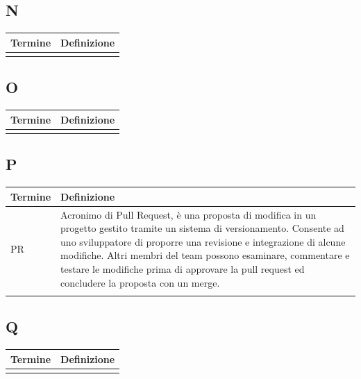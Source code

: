 \documentclass[10pt]{article}
\begin{document}
\subsection{N} %
\begin{tabularx}{\textwidth}{|>{\centering\arraybackslash}l|X|}
\hline
\rowcolor[gray]{0.8}
\textbf{Termine} & \textbf{Definizione}\\
\hline
 & \\
\hline
\end{tabularx}

\subsection{O} %
\begin{tabularx}{\textwidth}{|>{\centering\arraybackslash}l|X|}
\hline
\rowcolor[gray]{0.8}
\textbf{Termine} & \textbf{Definizione}\\
\hline
 & \\
\hline
\end{tabularx}

\subsection{P} %
\begin{tabularx}{\textwidth}{|>{\centering\arraybackslash}l|X|}
\hline
\rowcolor[gray]{0.8}
\textbf{Termine} & \textbf{Definizione}\\
\hline
PR & Acronimo di Pull Request, è una proposta di modifica in un progetto gestito tramite un sistema di versionamento. Consente ad uno sviluppatore di proporre una revisione e integrazione di alcune modifiche. Altri membri del team possono esaminare, commentare e testare le modifiche prima di approvare la pull request ed concludere la proposta con un merge.\\
\hline
 & \\
\hline
\end{tabularx}

\subsection{Q} %
\begin{tabularx}{\textwidth}{|>{\centering\arraybackslash}l|X|}
\hline
\rowcolor[gray]{0.8}
\textbf{Termine} & \textbf{Definizione}\\
\hline
 & \\
\hline
\end{tabularx}
\end{document}
